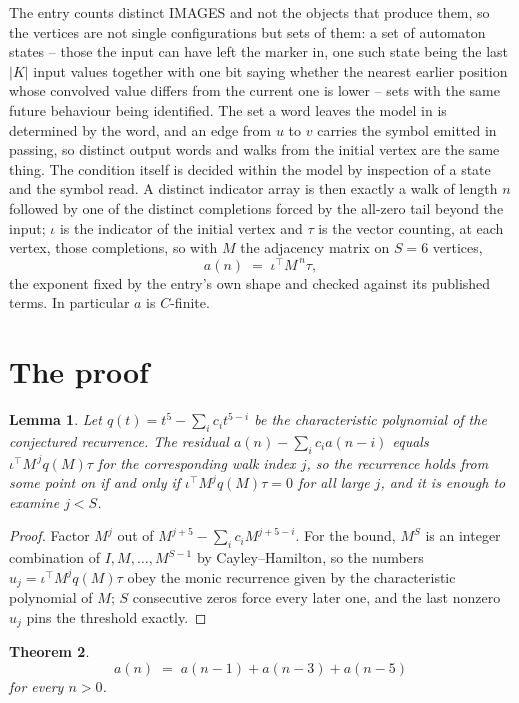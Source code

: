 \documentclass[11pt,a4paper]{article}
\theoremstyle{plain}
\newtheorem{theorem}{Theorem}
\newtheorem{lemma}[theorem]{Lemma}
\theoremstyle{definition}
\begin{document}
The entry counts distinct IMAGES and not the objects that produce them, so the vertices are not single configurations but sets of them: a set of automaton states -- those the input can have left the marker in, one such state being the last $|K|$ input values together with one bit saying whether the nearest earlier position whose convolved value differs from the current one is lower -- sets with the same future behaviour being identified. The set a word leaves the model in is determined by the word, and an edge from $u$ to $v$ carries the symbol emitted in passing, so distinct output words and walks from the initial vertex are the same thing. The condition itself is decided within the model by inspection of a state and the symbol read.
A distinct indicator array is then exactly a walk of length $n$ followed by one of the distinct completions forced by the all-zero tail beyond the input; $\iota$ is the indicator of the initial vertex and $\tau$ is the vector counting, at each vertex, those completions, so with $M$ the adjacency matrix on $S=6$ vertices,
\[
a(n)\;=\;\iota^{\!\top}M^{\,n}\tau ,
\]
the exponent fixed by the entry's own shape and checked against its published terms. In
particular $a$ is $C$-finite.

\section{The proof}

\begin{lemma}\label{lem:crit}
Let $q(t)=t^{5}-\sum_i c_it^{5-i}$ be the characteristic polynomial of the
conjectured recurrence. The residual $a(n)-\sum_ic_ia(n-i)$ equals
$\iota^{\!\top}M^{\,j}q(M)\tau$ for the corresponding walk index $j$, so the recurrence
holds from some point on if and only if $\iota^{\!\top}M^{j}q(M)\tau=0$ for all large $j$,
and it is enough to examine $j<S$.
\end{lemma}

\begin{proof}
Factor $M^{j}$ out of $M^{j+5}-\sum_ic_iM^{j+5-i}$. For the bound, $M^{S}$
is an integer combination of $I,M,\dots,M^{S-1}$ by Cayley--Hamilton, so the numbers
$u_j=\iota^{\!\top}M^{j}q(M)\tau$ obey the monic recurrence given by the characteristic
polynomial of $M$; $S$ consecutive zeros force every later one, and the last nonzero $u_j$
pins the threshold exactly.
\end{proof}

\begin{theorem}
\[
a(n)\;=\;a(n-1) + a(n-3) + a(n-5)
\]
for every $n>0$.
\end{theorem}
\end{document}

